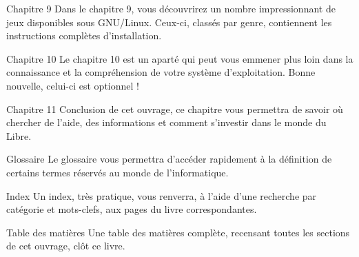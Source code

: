 \begin{DescriptionChapitres}
\item [Chapitre 9] Dans le chapitre 9, vous découvrirez un nombre impressionnant de jeux disponibles sous GNU/Linux. Ceux-ci, classés par genre, contiennent les instructions complètes d'installation.
\item [Chapitre 10] Le chapitre 10 est un aparté qui peut vous emmener plus loin dans la connaissance et la compréhension de votre système d'exploitation. Bonne nouvelle, celui-ci est optionnel !
\item [Chapitre 11] Conclusion de cet ouvrage, ce chapitre vous permettra de savoir où chercher de l'aide, des informations et comment s'investir dans le monde du Libre.
\item [Glossaire] Le glossaire vous permettra d'accéder rapidement à la définition de certains termes réservés au monde de l'informatique.
\item [Index] Un index, très pratique, vous renverra, à l'aide d'une recherche par catégorie et mots-clefs, aux pages du livre correspondantes.
\item [Table des matières] Une table des matières complète, recensant toutes les sections de cet ouvrage, clôt ce livre.
\end{DescriptionChapitres}
